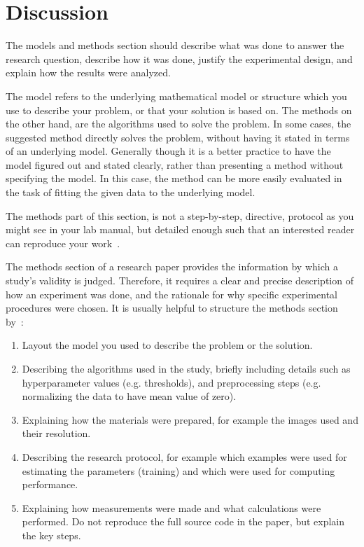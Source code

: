 \documentclass[10pt,conference,compsocconf]{IEEEtran}
\begin{document}
\section{Discussion}
\label{sec:discussion}
The models and methods
section should describe what was
done to answer the research question, describe how it was done,
justify the experimental design, and
explain how the results were analyzed.

The model refers to the underlying mathematical model or structure which 
you use to describe your problem, or that your solution is based on. 
The methods on the other hand, are the algorithms used to solve the problem. 
In some cases, the suggested method directly solves the problem, without having it 
stated in terms of an underlying model. Generally though it is a better practice to have 
the model figured out and stated clearly, rather than presenting a method without specifying 
the model. In this case, the method can be more easily evaluated in the task of fitting 
the given data to the underlying model.

The methods part of this section, is not a step-by-step, directive,
protocol as you might see in your lab manual, but detailed enough such
that an interested reader can reproduce your
work~\cite{anderson04,wavelab}.

The methods section of a research paper provides the information by
which a study's validity is judged.
Therefore, it requires a clear and precise description of how an
experiment was done, and the rationale
for why specific experimental procedures were chosen.
It is usually helpful to
structure the methods section by~\cite{kallet04methods}:
\begin{enumerate}
\item Layout the model you used to describe the problem or the solution.
\item Describing the algorithms used in the study, briefly including
  details such as hyperparameter values (e.g. thresholds), and
  preprocessing steps (e.g. normalizing the data to have mean value of
  zero).
\item Explaining how the materials were prepared, for example the
  images used and their resolution.
\item Describing the research protocol, for example which examples
  were used for estimating the parameters (training) and which were
  used for computing performance.
\item Explaining how measurements were made and what
  calculations were performed. Do not reproduce the full source code in
  the paper, but explain the key steps.
\end{enumerate}
\end{document}
